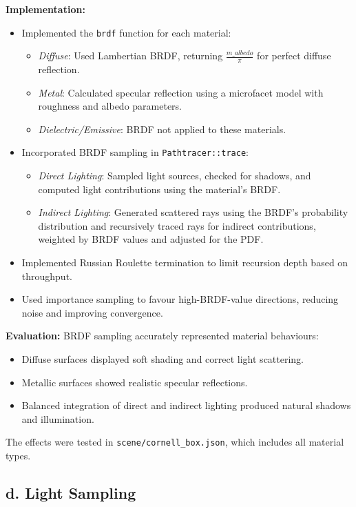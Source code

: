 \documentclass[11pt,a4paper]{article}
\begin{document}
\noindent\textbf{Implementation:}  
\begin{itemize}
    \item Implemented the \texttt{brdf} function for each material:  
    \begin{itemize}
        \item \textit{Diffuse}: Used Lambertian BRDF, returning \(\frac{m\_albedo}{\pi}\) for perfect diffuse reflection.  
        \item \textit{Metal}: Calculated specular reflection using a microfacet model with roughness and albedo parameters.  
        \item \textit{Dielectric/Emissive}: BRDF not applied to these materials.  
    \end{itemize}
    \item Incorporated BRDF sampling in \texttt{Pathtracer::trace}:  
    \begin{itemize}
        \item \textit{Direct Lighting}: Sampled light sources, checked for shadows, and computed light contributions using the material's BRDF.  
        \item \textit{Indirect Lighting}: Generated scattered rays using the BRDF's probability distribution and recursively traced rays for indirect contributions, weighted by BRDF values and adjusted for the PDF.  
    \end{itemize}  
    \item Implemented Russian Roulette termination to limit recursion depth based on throughput.  
    \item Used importance sampling to favour high-BRDF-value directions, reducing noise and improving convergence.  
\end{itemize}

\noindent\textbf{Evaluation:}  
BRDF sampling accurately represented material behaviours:  
\begin{itemize}
    \item Diffuse surfaces displayed soft shading and correct light scattering.  
    \item Metallic surfaces showed realistic specular reflections.  
    \item Balanced integration of direct and indirect lighting produced natural shadows and illumination.  
\end{itemize}  

The effects were tested in \texttt{scene/cornell\_box.json}, which includes all material types.

\subsection{d. Light Sampling}  
\label{sec:light-sampling}
\end{document}
